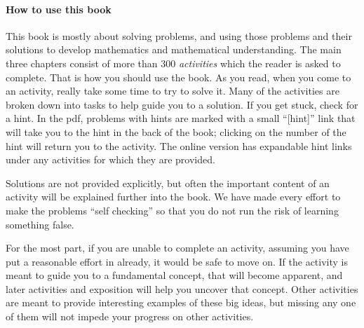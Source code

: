 \documentclass[10pt,]{book}
\theoremstyle{plain}
\theoremstyle{definition}
\theoremstyle{definition}
\theoremstyle{definition}
\numberwithin{equation}{chapter}
\begin{document}
\paragraph[{How to use this book}]{How to use this book}\hypertarget{paragraphs-1}{}
\hypertarget{p-9}{}%
This book is mostly about solving problems, and using those problems and their solutions to develop mathematics and mathematical understanding.  The main three chapters consist of more than 300 \emph{activities} which the reader is asked to complete.  That is how you should use the book.  As you read, when you come to an activity, really take some time to try to solve it.  Many of the activities are broken down into tasks to help guide you to a solution.  If you get stuck, check for a hint.  In the pdf, problems with hints are marked with a small ``[hint]'' link that will take you to the hint in the back of the book; clicking on the number of the hint will return you to the activity.  The online version has expandable hint links under any activities for which they are provided.%
\par
\hypertarget{p-10}{}%
Solutions are not provided explicitly, but often the important content of an activity will be explained further into the book.  We have made every effort to make the problems ``self checking'' so that you do not run the risk of learning something false.%
\par
\hypertarget{p-11}{}%
For the most part, if you are unable to complete an activity, assuming you have put a reasonable effort in already, it would be safe to move on.  If the activity is meant to guide you to a fundamental concept, that will become apparent, and later activities and exposition will help you uncover that concept.  Other activities are meant to provide interesting examples of these big ideas, but missing any one of them will not impede your progress on other activities.%
\setcounter{tocdepth}{2}
\renewcommand*\contentsname{Contents}
\tableofcontents
\mainmatter
\typeout{************************************************}
\typeout{************************************************}
\end{document}
